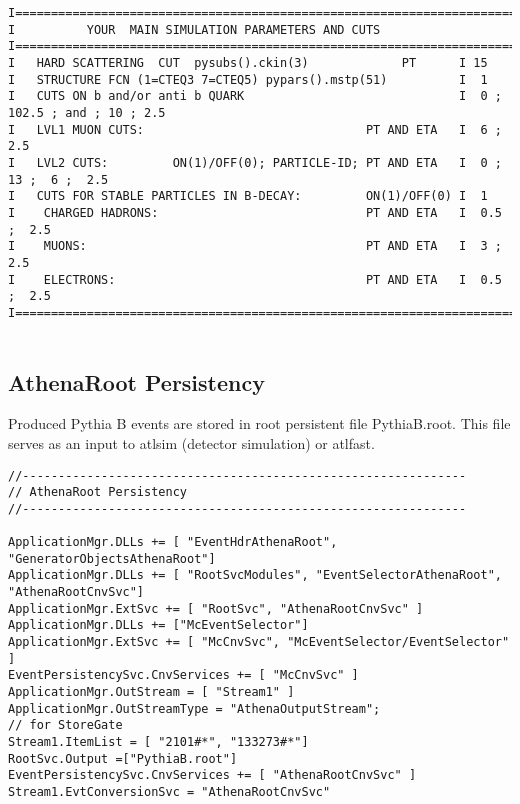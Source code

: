 \begin{verbatim}
I=====================================================================================
I          YOUR  MAIN SIMULATION PARAMETERS AND CUTS
I=====================================================================================
I   HARD SCATTERING  CUT  pysubs().ckin(3)             PT      I 15
I   STRUCTURE FCN (1=CTEQ3 7=CTEQ5) pypars().mstp(51)          I  1
I   CUTS ON b and/or anti b QUARK                              I  0 ; 102.5 ; and ; 10 ; 2.5
I   LVL1 MUON CUTS:                               PT AND ETA   I  6 ;  2.5
I   LVL2 CUTS:         ON(1)/OFF(0); PARTICLE-ID; PT AND ETA   I  0 ;  13 ;  6 ;  2.5
I   CUTS FOR STABLE PARTICLES IN B-DECAY:         ON(1)/OFF(0) I  1
I    CHARGED HADRONS:                             PT AND ETA   I  0.5 ;  2.5
I    MUONS:                                       PT AND ETA   I  3 ;  2.5
I    ELECTRONS:                                   PT AND ETA   I  0.5 ;  2.5
I=====================================================================================


\end{verbatim}


\subsection{AthenaRoot Persistency}

Produced Pythia B events are stored in root persistent file
PythiaB.root. This file  serves as an input to atlsim (detector simulation)
or atlfast.

\begin{verbatim}
//--------------------------------------------------------------
// AthenaRoot Persistency
//--------------------------------------------------------------

ApplicationMgr.DLLs += [ "EventHdrAthenaRoot", "GeneratorObjectsAthenaRoot"]
ApplicationMgr.DLLs += [ "RootSvcModules", "EventSelectorAthenaRoot", "AthenaRootCnvSvc"]
ApplicationMgr.ExtSvc += [ "RootSvc", "AthenaRootCnvSvc" ]
ApplicationMgr.DLLs += ["McEventSelector"]
ApplicationMgr.ExtSvc += [ "McCnvSvc", "McEventSelector/EventSelector" ]
EventPersistencySvc.CnvServices += [ "McCnvSvc" ]
ApplicationMgr.OutStream = [ "Stream1" ]
ApplicationMgr.OutStreamType = "AthenaOutputStream";
// for StoreGate
Stream1.ItemList = [ "2101#*", "133273#*"]
RootSvc.Output =["PythiaB.root"]
EventPersistencySvc.CnvServices += [ "AthenaRootCnvSvc" ]
Stream1.EvtConversionSvc = "AthenaRootCnvSvc"

\end{verbatim}

